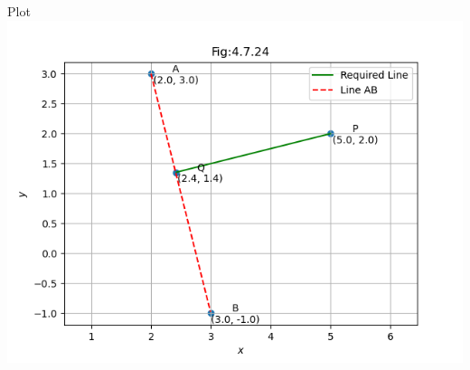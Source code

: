 \documentclass{beamer}
\begin{document}
\begin{frame}{Plot}
    \centering
    \includegraphics[width=\columnwidth, height=0.8\textheight, keepaspectratio]{../figs/perpendicular1.png}   
\end{frame}
\end{document}

